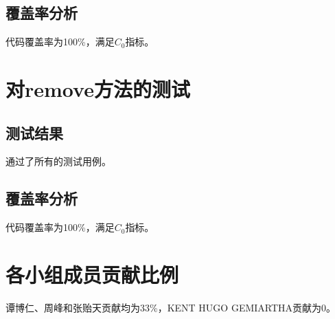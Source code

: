 \documentclass[12pt, a4paper, oneside]{ctexart}
\begin{document}
\subsection{覆盖率分析}
    代码覆盖率为100\%，满足$C_0$指标。

\section{对remove方法的测试}
\subsection{测试结果}
    通过了所有的测试用例。

\subsection{覆盖率分析}
    代码覆盖率为100\%，满足$C_0$指标。

\section{各小组成员贡献比例}
谭博仁、周峰和张贻天贡献均为33\%，KENT HUGO GEMIARTHA贡献为0。
\end{document}
